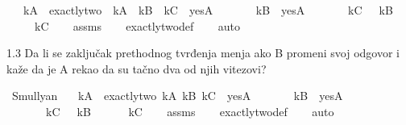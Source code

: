 \begin{isabellebody}
\begin{exercise}[subtitle=Raymond M. Smullyan: Logical Labyrinths]
\ \ \ {\isachardoublequoteopen}kA\ {\isasymlongleftrightarrow}\ {\isacharparenleft}{\kern0pt}exactly{\isacharunderscore}{\kern0pt}two\ {\isacharparenleft}{\kern0pt}{\isasymnot}\ kA{\isacharparenright}{\kern0pt}\ {\isacharparenleft}{\kern0pt}{\isasymnot}\ kB{\isacharparenright}{\kern0pt}\ {\isacharparenleft}{\kern0pt}{\isasymnot}\ kC{\isacharparenright}{\kern0pt}\ {\isasymlongleftrightarrow}\ yesA{\isacharparenright}{\kern0pt}{\isachardoublequoteclose}\isanewline
\ \ \ \ \ \ \ {\isachardoublequoteopen}kB\ {\isasymlongleftrightarrow}\ yesA{\isachardoublequoteclose}\isanewline
\ \ \ \ \ \ \ {\isachardoublequoteopen}kC\ {\isasymlongleftrightarrow}\ {\isasymnot}\ kB{\isachardoublequoteclose}\isanewline
\ \ \ \ \ {\isachardoublequoteopen}kC{\isachardoublequoteclose}\isanewline
%
\isadelimproof
\ \ %
\endisadelimproof
%
\isatagproof
{}\isamarkupfalse%
\ assms\isanewline
\ \ \isamarkupfalse%
\ exactly{\isacharunderscore}{\kern0pt}two{\isacharunderscore}{\kern0pt}def\isanewline
\ \ \isamarkupfalse%
\ auto%
\endisatagproof
{\isafoldproof}%
%
\isadelimproof
%
\endisadelimproof
%
\begin{isamarkuptext}%
1.3 Da li se zaključak prethodnog tvrđenja menja ako B promeni svoj odgovor 
          i kaže da je A rekao da su tačno dva od njih vitezovi?%
\end{isamarkuptext}\isamarkuptrue%
\isamarkupfalse%
\ Smullyan{\isacharunderscore}{\kern0pt}{}{\isacharunderscore}{\kern0pt}{}{\isacharcolon}{\kern0pt}\isanewline
\ \ \ {\isachardoublequoteopen}kA\ {\isasymlongleftrightarrow}\ {\isacharparenleft}{\kern0pt}exactly{\isacharunderscore}{\kern0pt}two\ kA\ kB\ kC\ {\isasymlongleftrightarrow}\ yesA{\isacharparenright}{\kern0pt}{\isachardoublequoteclose}\isanewline
\ \ \ \ \ \ \ {\isachardoublequoteopen}kB\ {\isasymlongleftrightarrow}\ yesA{\isachardoublequoteclose}\isanewline
\ \ \ \ \ \ \ {\isachardoublequoteopen}kC\ {\isasymlongleftrightarrow}\ {\isasymnot}\ kB{\isachardoublequoteclose}\isanewline
\ \ \ \ \ {\isachardoublequoteopen}{\isasymnot}\ kC{\isachardoublequoteclose}\isanewline
%
\isadelimproof
\ \ %
\endisadelimproof
%
\isatagproof
{}\isamarkupfalse%
\ assms\isanewline
\ \ \isamarkupfalse%
\ exactly{\isacharunderscore}{\kern0pt}two{\isacharunderscore}{\kern0pt}def\isanewline
\ \ \isamarkupfalse%
\ auto%
\endisatagproof
{\isafoldproof}%
%
\isadelimproof
%
\endisadelimproof
%
\end{exercise}
%
\isadelimtheory
%
\endisadelimtheory
%
\isatagtheory
%
\endisatagtheory
{\isafoldtheory}%
%
\isadelimtheory
%
\endisadelimtheory
%
\end{isabellebody}%
